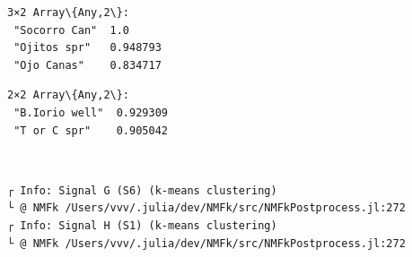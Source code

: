 \documentclass[11pt]{article}
\begin{document}
    
    \begin{Verbatim}[commandchars=\\\{\}]
3×2 Array\{Any,2\}:
 "Socorro Can"  1.0
 "Ojitos spr"   0.948793
 "Ojo Canas"    0.834717
    \end{Verbatim}

    
    
    \begin{Verbatim}[commandchars=\\\{\}]
2×2 Array\{Any,2\}:
 "B.Iorio well"  0.929309
 "T or C spr"    0.905042
    \end{Verbatim}

    
    \begin{center}
    \end{center}
    { \hspace*{\fill} \\}
    
    \begin{Verbatim}[commandchars=\\\{\}]
┌ Info: Signal G (S6) (k-means clustering)
└ @ NMFk /Users/vvv/.julia/dev/NMFk/src/NMFkPostprocess.jl:272
┌ Info: Signal H (S1) (k-means clustering)
└ @ NMFk /Users/vvv/.julia/dev/NMFk/src/NMFkPostprocess.jl:272
    \end{Verbatim}

    \begin{center}
    \end{center}
    { \hspace*{\fill} \\}
    
    \begin{Verbatim}[commandchars=\\\{\}]

    \end{Verbatim}

    \begin{center}
    \end{center}
    { \hspace*{\fill} \\}
    
    \begin{center}
    \end{center}
    { \hspace*{\fill} \\}
    
\end{document}
